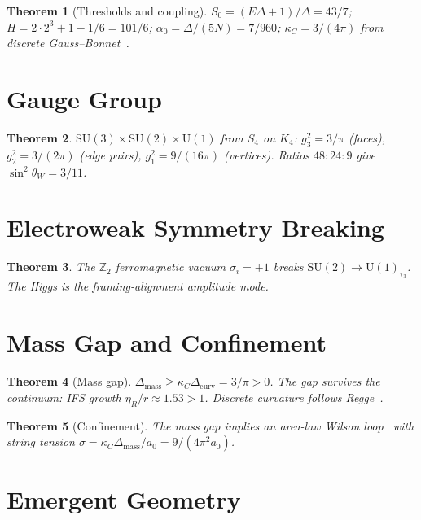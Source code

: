 \documentclass[11pt,twocolumn]{article}
\newtheorem{theorem}{Theorem}
\begin{document}
\begin{theorem}[Thresholds and coupling]
\label{thm:constants}
$S_0=(E\Delta{+}1)/\Delta=43/7$; $H=2\cdot 2^3{+}1{-}1/6=101/6$; $\alpha_0=\Delta/(5N)=7/960$; $\kappa_C=3/(4\pi)$ from discrete Gauss--Bonnet~\cite{hirani2003}.
\end{theorem}

\section{Gauge Group}
\label{sec:gauge}

\begin{theorem}
$\mathrm{SU}(3){\times}\mathrm{SU}(2){\times}\mathrm{U}(1)$ from $S_4$ on $K_4$: $g_3^2{=}3/\pi$ (faces), $g_2^2{=}3/(2\pi)$ (edge pairs), $g_1^2{=}9/(16\pi)$ (vertices).
Ratios $48{:}24{:}9$ give $\sin^2\theta_W=3/11$.
\end{theorem}

\section{Electroweak Symmetry Breaking}
\label{sec:ewsb}

\begin{theorem}
The $\mathbb{Z}_2$ ferromagnetic vacuum $\sigma_i{=}{+}1$ breaks $\mathrm{SU}(2)\to\mathrm{U}(1)_{\tau_3}$.
The Higgs is the framing-alignment amplitude mode.
\end{theorem}

\section{Mass Gap and Confinement}
\label{sec:massgap}

\begin{theorem}[Mass gap]
$\Delta_{\mathrm{mass}}\geq\kappa_C\Delta_{\mathrm{curv}}=3/\pi>0$.
The gap survives the continuum: IFS growth $\eta_R/r\approx 1.53>1$.
Discrete curvature follows Regge~\cite{regge1961}.
\end{theorem}

\begin{theorem}[Confinement]
The mass gap implies an area-law Wilson loop~\cite{wilson1974} with string tension $\sigma=\kappa_C\Delta_{\mathrm{mass}}/a_0=9/(4\pi^2 a_0)$.
\end{theorem}

\section{Emergent Geometry}
\label{sec:geometry}
\end{document}

